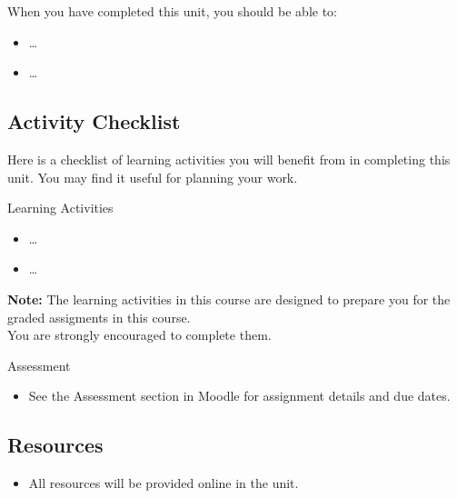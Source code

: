 \documentclass[
]{book}
\providecommand{\tightlist}{%
  \setlength{\itemsep}{0pt}\setlength{\parskip}{0pt}}
\theoremstyle{definition}
\theoremstyle{definition}
\theoremstyle{definition}
\theoremstyle{definition}
\theoremstyle{remark}
\begin{document}
When you have completed this unit, you should be able to:

\begin{itemize}
\tightlist
\item
  \ldots{}
\item
  \ldots{}
\end{itemize}

\hypertarget{activity-checklist-2}{%
\subsection*{Activity Checklist}\label{activity-checklist-2}}

Here is a checklist of learning activities you will benefit from in completing this unit. You may find it useful for planning your work.

\begin{reflect}
{Learning Activities}

\begin{itemize}
\tightlist
\item
  \ldots{}
\item
  \ldots{}
\end{itemize}

\textbf{Note:} The learning activities in this course are designed to prepare you for the graded assigments in this course.\\
You are strongly encouraged to complete them.
\end{reflect}

\begin{assessment}
{Assessment}

\begin{itemize}
\tightlist
\item
  See the Assessment section in Moodle for assignment details and due dates.
\end{itemize}
\end{assessment}

\hypertarget{resources-2}{%
\subsection*{Resources}\label{resources-2}}

\begin{itemize}
\tightlist
\item
  All resources will be provided online in the unit.
\end{itemize}
\end{document}
